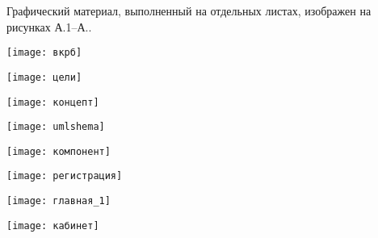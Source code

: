 
Графический материал, выполненный на отдельных листах,
изображен на рисунках А.1--А..
\setcounter{числоПлакатов}{0}

\renewcommand{\thefigure}{А.\arabic{figure}} %

\begin{landscape}
\begin{плакат}
	\centering
    \texttt{[image: вкрб]}
    \label{pl1:image}      
\end{плакат}

\begin{плакат}
	\centering
    \texttt{[image: цели]}
    \label{pl2:image}      
\end{плакат}

\begin{плакат}
	\centering
    \texttt{[image: концепт]}
    \label{pl3:image}      
\end{плакат}

\begin{плакат}
	\centering
    \texttt{[image: umlshema]}
    \label{pl4:image}      
\end{плакат}

\begin{плакат}
	\centering
	\texttt{[image: компонент]}
	\label{pl5:image}      
\end{плакат}

\begin{плакат}
	\centering
	\texttt{[image: регистрация]}
	\label{pl6:image}      
\end{плакат}

\begin{плакат}
	\centering
	\texttt{[image: главная\_1]}
	\label{pl7:image}      
\end{плакат}

\begin{плакат}
	\centering
	\texttt{[image: кабинет]}
	\label{pl8:image}      
\end{плакат}


\end{landscape}
